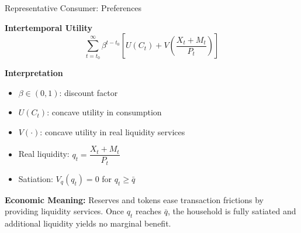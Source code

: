 \documentclass[11pt,aspectratio=169]{beamer}
\begin{document}
\begin{frame}{Representative Consumer: Preferences}
\small

\textbf{Intertemporal Utility}
\begin{equation}
\sum_{t=t_0}^{\infty}
\beta^{t-t_0}
\left[
U(C_t)
+ V\!\left(\frac{X_t + M_t}{P_t}\right)
\right]
\label{eq:utility_cbdc}
\end{equation}

\textbf{Interpretation}
\begin{itemize}
  \item $\beta \in (0,1)$: discount factor  
  \item $U(C_t)$: concave utility in consumption  
  \item $V(\cdot)$: concave utility in real liquidity services  
  \item Real liquidity: $q_t = \dfrac{X_t + M_t}{P_t}$  
  \item Satiation: $V_q(q_t)=0$ for $q_t \ge \bar q$
\end{itemize}

\textbf{Economic Meaning:}  
Reserves and tokens ease transaction frictions by providing liquidity services. Once $q_t$ reaches $\bar q$, the household is fully satiated and additional liquidity yields no marginal benefit.

\end{frame}
\end{document}
